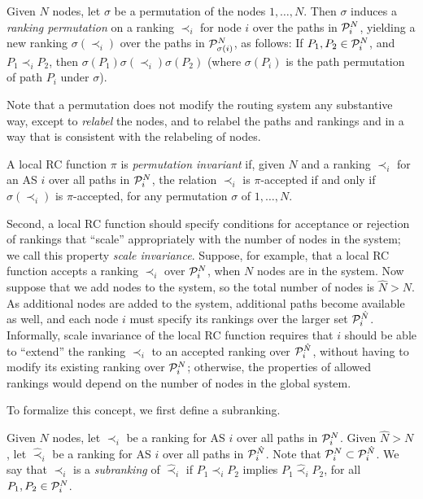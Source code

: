 \begin{defn}
Given $N$ nodes, let $\sigma$ be a permutation of the nodes
$1,\ldots,N$.  Then $\sigma$ induces a {\em ranking permutation} on
a ranking $\prec_i$ for node $i$ over the paths in
$\P_i^N$, yielding a new ranking $\sigma(\prec_i)$ over
the paths in $\P_{\sigma(i)}^N$, as follows: 
If $P_1, P_2 \in \P_i^N$, and $P_1 \prec_i P_2$, then $\sigma(P_1) 
\sigma(\prec_i) \sigma(P_2)$ (where $\sigma(P_i)$ is the path
permutation of path $P_i$ under $\sigma$).
\end{defn}

Note that a
permutation does not modify the routing system any substantive way, except to {\em
relabel} the nodes, and to relabel the paths and rankings and in a
way that is consistent with the relabeling of nodes.

\begin{defn}
A local RC function $\pi$ is {\em permutation invariant} if, given $N$ and a
ranking $\prec_i$ for an AS $i$ over all paths in
$\P_i^N$, the relation $\prec_i$ is $\pi$-accepted if and only if
$\sigma(\prec_i)$ is $\pi$-accepted, for any permutation $\sigma$ of
$1, \ldots, N$.
\end{defn}

Second, a local RC function should specify conditions for acceptance or
rejection of rankings that ``scale'' appropriately with the number of
nodes in the system; we call this property {\em scale invariance}.
Suppose, for example, that a local RC function accepts a ranking $\prec_i$ over
$\P_i^N$, when $N$ nodes are in the system.  Now suppose that we add
nodes to the system, so the total number of nodes is $\hat{N} > N$.
As additional nodes are added to the system, additional paths become
available as well, and each node $i$ must specify its rankings over
the larger set $\P_i^{\hat{N}}$.  Informally, scale invariance of the
local RC function requires that $i$ should be able to ``extend'' the ranking
$\prec_i$ to an accepted ranking over $\P_i^{\hat{N}}$, without having
to modify its existing ranking over $\P_i^N$; otherwise, the
properties of allowed rankings would depend on the
number of nodes in the global system.

To formalize this concept, we first define a subranking.

\begin{defn}[Subranking]
Given $N$ nodes, let $\prec_i$ be a ranking for AS $i$
over all paths in $\P_i^N$.  Given $\hat{N} > N$, let
$\hat{\prec}_i$ be a ranking for AS $i$ over all paths
in $\P_i^{\hat{N}}$.  Note that $\P_i^N \subset \P_i^{\hat{N}}$.  We
say that $\prec_i$ is a {\em subranking} of
$\hat{\prec}_i$ if $P_1 \prec_i P_2$ implies $P_1
\hat{\prec}_i P_2$, for all $P_1, P_2 \in \P_i^N$.
\end{defn}

